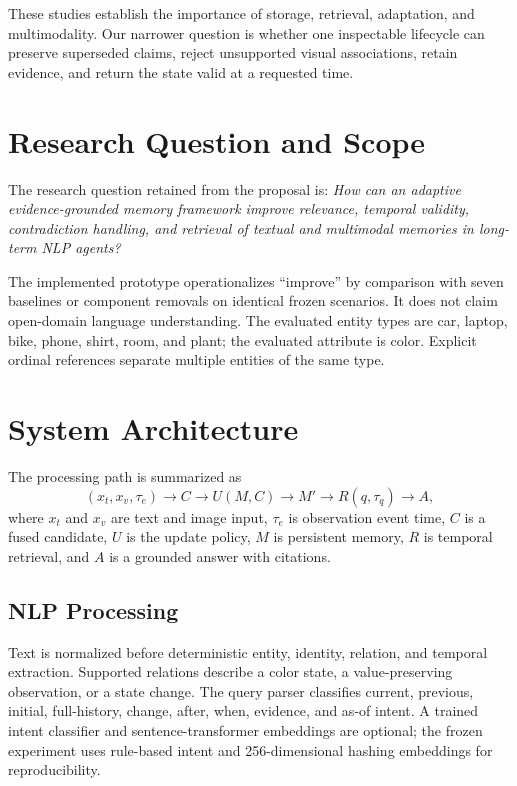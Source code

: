 \documentclass[conference]{IEEEtran}
\begin{document}
These studies establish the importance of storage, retrieval, adaptation, and multimodality. Our narrower question is whether one inspectable lifecycle can preserve superseded claims, reject unsupported visual associations, retain evidence, and return the state valid at a requested time.

\section{Research Question and Scope}
The research question retained from the proposal is: \emph{How can an adaptive evidence-grounded memory framework improve relevance, temporal validity, contradiction handling, and retrieval of textual and multimodal memories in long-term NLP agents?}

The implemented prototype operationalizes ``improve'' by comparison with seven baselines or component removals on identical frozen scenarios. It does not claim open-domain language understanding. The evaluated entity types are car, laptop, bike, phone, shirt, room, and plant; the evaluated attribute is color. Explicit ordinal references separate multiple entities of the same type.

\section{System Architecture}
The processing path is summarized as
\begin{equation}
 (x_t, x_v, \tau_e) \rightarrow C \rightarrow U(M,C) \rightarrow M' \rightarrow R(q,\tau_q) \rightarrow A,
\end{equation}
where $x_t$ and $x_v$ are text and image input, $\tau_e$ is observation event time, $C$ is a fused candidate, $U$ is the update policy, $M$ is persistent memory, $R$ is temporal retrieval, and $A$ is a grounded answer with citations.

\subsection{NLP Processing}
Text is normalized before deterministic entity, identity, relation, and temporal extraction. Supported relations describe a color state, a value-preserving observation, or a state change. The query parser classifies current, previous, initial, full-history, change, after, when, evidence, and as-of intent. A trained intent classifier and sentence-transformer embeddings are optional; the frozen experiment uses rule-based intent and 256-dimensional hashing embeddings for reproducibility.
\end{document}
